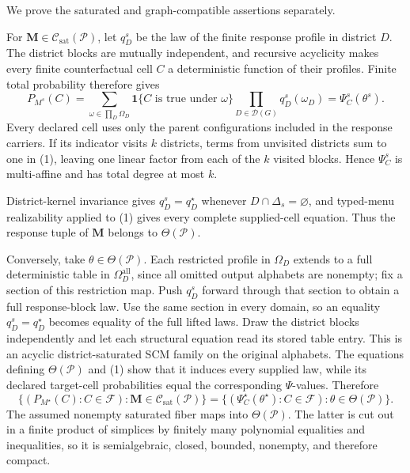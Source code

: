 We prove the saturated and graph-compatible assertions separately.

For \(\mathbf M\in\mathcal C_{\mathrm{sat}}(\mathcal P)\), let \(q_D^s\) be the law of the finite response profile in district \(D\). The district blocks are mutually independent, and recursive acyclicity makes every finite counterfactual cell \(C\) a deterministic function of their profiles. Finite total probability therefore gives
\[
P_{M^s}(C)
=\sum_{\omega\in\prod_D\Omega_D}\mathbf1\{C\text{ is true under }\omega\}
\prod_{D\in\mathcal D(G)}q_D^s(\omega_D)
=\Psi_C^s(\theta^s).\tag{1}
\]
Every declared cell uses only the parent configurations included in the response carriers. If its indicator visits \(k\) districts, terms from unvisited districts sum to one in (1), leaving one linear factor from each of the \(k\) visited blocks. Hence \(\Psi_C^s\) is multi-affine and has total degree at most \(k\).

District-kernel invariance gives \(q_D^s=q_D^\star\) whenever
\(D\cap\Delta_s=\varnothing\), and typed-menu realizability applied to (1) gives every complete supplied-cell equation. Thus the response tuple of \(\mathbf M\) belongs to \(\Theta(\mathcal P)\).

Conversely, take \(\theta\in\Theta(\mathcal P)\). Each restricted profile in \(\Omega_D\) extends to a full deterministic table in \(\Omega_D^{\mathrm{all}}\), since all omitted output alphabets are nonempty; fix a section of this restriction map. Push \(q_D^s\) forward through that section to obtain a full response-block law. Use the same section in every domain, so an equality \(q_D^s=q_D^\star\) becomes equality of the full lifted laws. Draw the district blocks independently and let each structural equation read its stored table entry. This is an acyclic district-saturated SCM family on the original alphabets. The equations defining \(\Theta(\mathcal P)\) and (1) show that it induces every supplied law, while its declared target-cell probabilities equal the corresponding \(\Psi\)-values. Therefore
\[
\{(P_{M^\star}(C):C\in\mathcal F):\mathbf M\in\mathcal C_{\mathrm{sat}}(\mathcal P)\}
=\{(\Psi_C^\star(\theta^\star):C\in\mathcal F):\theta\in\Theta(\mathcal P)\}.\tag{2}
\]
The assumed nonempty saturated fiber maps into \(\Theta(\mathcal P)\). The latter is cut out in a finite product of simplices by finitely many polynomial equalities and inequalities, so it is semialgebraic, closed, bounded, nonempty, and therefore compact.

